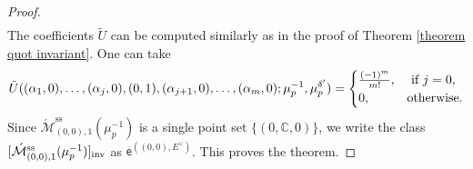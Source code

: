 \documentclass[11pt]{amsart}
\theoremstyle{remark}
\newcommand{\C}{\mathbb{C}}
\newcommand{\Mdash}{\acute{\mathcal{M}}}
\newcommand{\inv}[0]{\textnormal{inv}}
\renewcommand{\ss}[0]{\text{ss}}
\numberwithin{theorem}{section}
\begin{document}
\begin{proof}
\begin{align*}
    \end{align*}
        The coefficients $\tilde U$ can be computed similarly as in the proof of Theorem \ref{theorem quot invariant}.
        One can take 
        $$\tilde U((\alpha_1,0),\dots,(\alpha_j,0), (0,1),(\alpha_{j+1},0),\dots, (\alpha_m,0); \mu_p^{-1},\mu_p^{\delta'}) = 
        \begin{cases}
            \frac{(-1)^m}{m!}, &\text{ if } j=0,\\
            0, &\textnormal{otherwise.}
        \end{cases}$$
    Since $\Mdash^{\ss}_{(0,0),1}(\mu_p^{-1})$ is a single point set $\{(0,\C,0)\}$, we write the class $[\Mdash^{\ss}_{(0,0),1}(\mu_p^{-1})]_\inv$ as $\mathsf e^{((0,0),E^\vee)}$.
    This proves the theorem.
    \end{proof}
\end{document}
